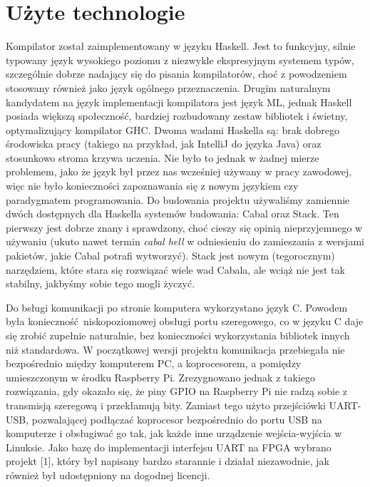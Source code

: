 \section{Użyte technologie}

Kompilator został zaimplementowany w języku Haskell. Jest to funkcyjny, silnie typowany język wysokiego poziomu z niezwykle ekspresyjnym systemem typów, szczególnie dobrze nadający się do pisania kompilatorów, choć z powodzeniem stosowany również jako język ogólnego przeznaczenia. Drugim naturalnym kandydatem na język implementacji kompilatora jest język ML, jednak Haskell posiada większą społeczność, bardziej rozbudowany zestaw bibliotek i świetny, optymalizujący kompilator GHC. Dwoma wadami Haskella są: brak dobrego środowiska pracy (takiego na przykład, jak IntelliJ do języka Java) oraz stosunkowo stroma krzywa uczenia. Nie było to jednak w żadnej mierze problemem, jako że język był przez nas wcześniej używany w pracy zawodowej, więc nie było konieczności zapoznawania się z nowym językiem czy paradygmatem programowania. Do budowania projektu używaliśmy zamiennie dwóch dostępnych dla Haskella systemów budowania: Cabal oraz Stack. Ten pierwszy jest dobrze znany i sprawdzony, choć cieszy się opinią nieprzyjemnego w używaniu (ukuto nawet termin \textit{cabal hell} w odniesieniu do zamieszania z wersjami pakietów, jakie Cabal potrafi wytworzyć). Stack jest nowym (tegorocznym) narzędziem, które stara się rozwiązać wiele wad Cabala, ale wciąż nie jest tak stabilny, jakbyśmy sobie tego mogli życzyć.

Do bsługi komunikacji po stronie komputera wykorzystano język C. Powodem była konieczność niskopoziomowej obsługi portu szeregowego, co w języku C daje się zrobić zupełnie naturalnie, bez konieczności wykorzystania bibliotek innych niż standardowa. W początkowej wersji projektu komunikacja przebiegała nie bezpośrednio między komputerem PC, a koprocesorem, a pomiędzy umieszczonym w środku Raspberry Pi. Zrezygnowano jednak z takiego rozwiązania, gdy okazało się, że piny GPIO na Raspberry Pi nie radzą sobie z transmisją szeregową i przekłamują bity. Zamiast tego użyto przejściówki UART-USB, pozwalającej podłączać koprocesor bezpośrednio do portu USB na komputerze i obsługiwać go tak, jak każde inne urządzenie wejścia-wyjścia w Linuksie. Jako bazę do implementacji interfejsu UART na FPGA wybrano projekt [1], który był napisany bardzo starannie i działał niezawodnie, jak również był udostępniony na dogodnej licencji.

